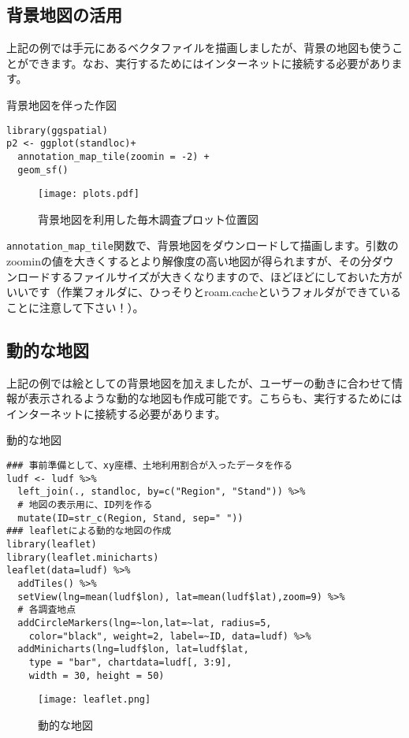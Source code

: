   \subsection{背景地図の活用}
上記の例では手元にあるベクタファイルを描画しましたが、背景の地図も使うことができます。なお、実行するためにはインターネットに接続する必要があります。
\begin{itembox}[l]{背景地図を伴った作図}
\begin{verbatim}
library(ggspatial)
p2 <- ggplot(standloc)+
  annotation_map_tile(zoomin = -2) +
  geom_sf()
\end{verbatim}
\end{itembox}
\begin{figure}[htb]
\begin{center}
\graphicspath{{2_gis/figs/}}
\texttt{[image: plots.pdf]}\\
\caption{背景地図を利用した毎木調査プロット位置図}
\label{plots}
\end{center}
\end{figure}
\verb|annotation_map_tile|関数で、背景地図をダウンロードして描画します。引数のzoominの値を大きくするとより解像度の高い地図が得られますが、その分ダウンロードするファイルサイズが大きくなりますので、ほどほどにしておいた方がいいです（作業フォルダに、ひっそりとroam.cacheというフォルダができていることに注意して下さい！）。

  \subsection{動的な地図}
上記の例では絵としての背景地図を加えましたが、ユーザーの動きに合わせて情報が表示されるような動的な地図も作成可能です。こちらも、実行するためにはインターネットに接続する必要があります。
\begin{itembox}[l]{動的な地図}
\begin{verbatim}
### 事前準備として、xy座標、土地利用割合が入ったデータを作る
ludf <- ludf %>%
  left_join(., standloc, by=c("Region", "Stand")) %>%
  # 地図の表示用に、ID列を作る
  mutate(ID=str_c(Region, Stand, sep=" "))
### leafletによる動的な地図の作成
library(leaflet)
library(leaflet.minicharts)
leaflet(data=ludf) %>% 
  addTiles() %>% 
  setView(lng=mean(ludf$lon), lat=mean(ludf$lat),zoom=9) %>%
  # 各調査地点
  addCircleMarkers(lng=~lon,lat=~lat, radius=5,
    color="black", weight=2, label=~ID, data=ludf) %>%
  addMinicharts(lng=ludf$lon, lat=ludf$lat,
    type = "bar", chartdata=ludf[, 3:9],
    width = 30, height = 50)
\end{verbatim}
\end{itembox}
\begin{figure}[htb]
\begin{center}
\graphicspath{{2_gis/figs/}}
\texttt{[image: leaflet.png]}\\
\caption{動的な地図}
\label{leaflet}
\end{center}
\end{figure}
